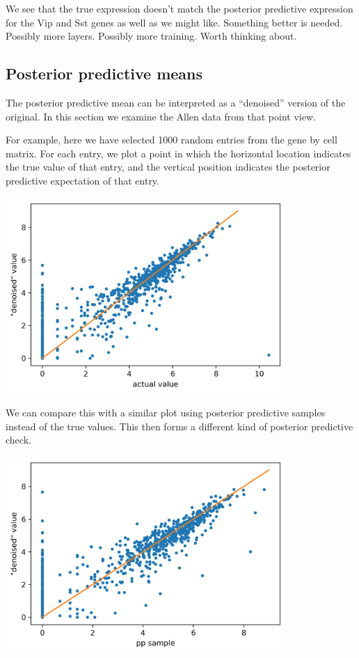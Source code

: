 We see that the true expression doesn't match the posterior predictive expression for the Vip and Sst genes as well as we might like.  Something better is needed.  Possibly more layers.  Possibly more training.  Worth thinking about.

\subsection{Posterior predictive means}

The posterior predictive mean can be interpreted as a ``denoised'' version of the original.  In this section we examine the Allen data from that point view.

For example, here we have selected 1000 random entries from the gene by cell matrix.  For each entry, we plot a point in which the horizontal location indicates the true value of that entry, and the vertical position indicates the posterior predictive expectation of that entry.  

\includegraphics[width=0.8\textwidth]{pics/resids2}

We can compare this with a similar plot using posterior predictive samples instead of the true values.  This then forms a different kind of posterior predictive check.  

\includegraphics[width=0.8\textwidth]{pics/resids3}

